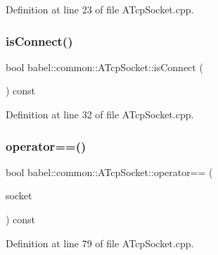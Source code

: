 Definition at line 23 of file A\+Tcp\+Socket.\+cpp.

\mbox{\label{classbabel_1_1common_1_1_a_tcp_socket_af253a6e358f04cdfe2daf19244f6d614}} 
\subsubsection{\texorpdfstring{is\+Connect()}{isConnect()}}
{\footnotesize\ttfamily bool babel\+::common\+::\+A\+Tcp\+Socket\+::is\+Connect (\begin{DoxyParamCaption}{ }\end{DoxyParamCaption}) const}



Definition at line 32 of file A\+Tcp\+Socket.\+cpp.

\mbox{\label{classbabel_1_1common_1_1_a_tcp_socket_ae6434c16ae66afbcf46e5253da01024c}} 
\subsubsection{\texorpdfstring{operator==()}{operator==()}\hspace{0.1cm}{\footnotesize\ttfamily [1/2]}}
{\footnotesize\ttfamily bool babel\+::common\+::\+A\+Tcp\+Socket\+::operator== (\begin{DoxyParamCaption}\item[{const \mbox{\hyperlink{classbabel_1_1common_1_1_a_tcp_socket}{A\+Tcp\+Socket}} \&}]{socket }\end{DoxyParamCaption}) const}



Definition at line 79 of file A\+Tcp\+Socket.\+cpp.


